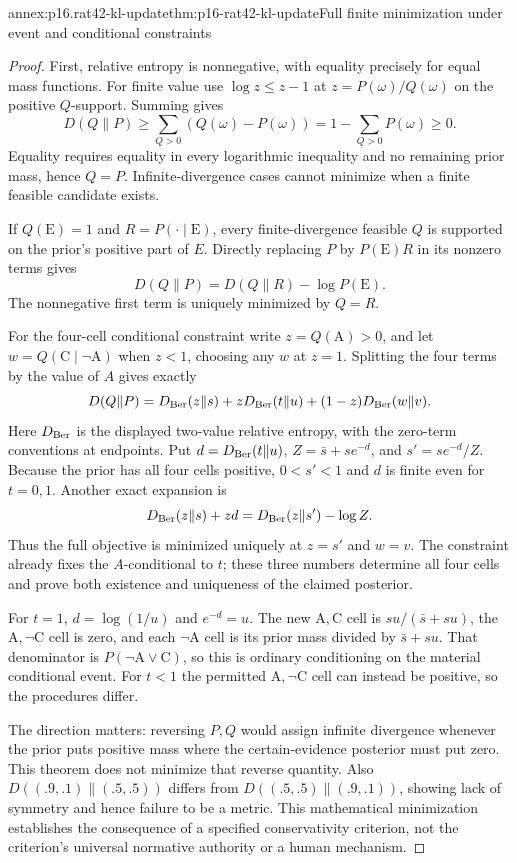 \begin{annexitem}{annex:p16.rat42-kl-update}{thm:p16-rat42-kl-update}{Full finite minimization under event and conditional constraints}
\begin{proof}
First, relative entropy is nonnegative, with equality precisely for
equal mass functions. For finite value use \(\log z\leq z-1\)
at \(z=P(\omega)/Q(\omega)\) on the positive \(Q\)-support.
Summing gives
\[
 D(Q\|P)\geq
  \sum_{Q>0}(Q(\omega)-P(\omega))
  =1-\sum_{Q>0}P(\omega)\geq0.
\]
Equality requires equality in every logarithmic inequality and no
remaining prior mass, hence \(Q=P\). Infinite-divergence cases cannot
minimize when a finite feasible candidate exists.

If \(Q(\mathrm E)=1\) and \(R=P(\cdot\mid\mathrm E)\),
every finite-divergence feasible \(Q\) is supported on the prior's
positive part of \(E\). Directly replacing \(P\) by
\(P(\mathrm E)R\) in its nonzero terms gives
\[
              D(Q\|P)=D(Q\|R)-\log P(\mathrm E).
\]
The nonnegative first term is uniquely minimized by \(Q=R\).

For the four-cell conditional constraint write
\(z=Q(\mathrm A)>0\), and let
\(w=Q(\mathrm C\mid\neg\mathrm A)\) when \(z<1\), choosing
any \(w\) at \(z=1\). Splitting the four terms by the value of
\(A\) gives exactly
\[
 D(Q\|P)=D_{\rm Ber}(z\|s)+zD_{\rm Ber}(t\|u)
                         +(1-z)D_{\rm Ber}(w\|v).
\]
Here \(D_{\rm Ber}\) is the displayed two-value relative entropy,
with the zero-term conventions at endpoints. Put
\(d=D_{\rm Ber}(t\|u)\),
\(Z=\bar s+s e^{-d}\), and \(s'=s e^{-d}/Z\).
Because the prior has all four cells positive, \(0<s'<1\)
and \(d\) is finite even for \(t=0,1\). Another exact expansion is
\[
 D_{\rm Ber}(z\|s)+zd
                     =D_{\rm Ber}(z\|s')-\log Z.
\]
Thus the full objective is minimized uniquely at \(z=s'\) and
\(w=v\). The constraint already fixes the \(A\)-conditional to
\(t\); these three numbers determine all four cells and prove
both existence and uniqueness of the claimed posterior.

For \(t=1\), \(d=\log(1/u)\) and \(e^{-d}=u\).
The new \(\mathrm A,\mathrm C\) cell is
\(su/(\bar s+su)\), the \(\mathrm A,\neg\mathrm C\) cell is
zero, and each \(\neg\mathrm A\) cell is its prior mass divided
by \(\bar s+su\). That denominator is
\(P(\neg\mathrm A\lor\mathrm C)\), so this is ordinary
conditioning on the material conditional event. For \(t<1\)
the permitted \(\mathrm A,\neg\mathrm C\) cell can instead
be positive, so the procedures differ.

The direction matters: reversing \(P,Q\) would assign infinite
divergence whenever the prior puts positive mass where the certain-evidence
posterior must put zero. This theorem does not minimize that reverse
quantity. Also \(D((.9,.1)\|(.5,.5))\) differs from
\(D((.5,.5)\|(.9,.1))\), showing lack of symmetry and hence
failure to be a metric. This mathematical minimization establishes
the consequence of a specified conservativity criterion, not the
criterion's universal normative authority or a human mechanism.
\end{proof}
\end{annexitem}

